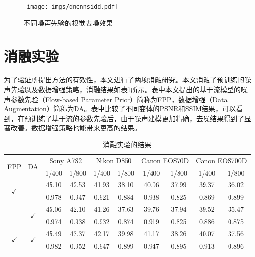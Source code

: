 \begin{figure}[h]
	\centering
	\texttt{[image: imgs/dncnnsidd.pdf]}
	\caption{不同噪声先验的视觉去噪效果}
	\label{fig:dncnnsidd}
\end{figure}

\section{消融实验}

为了验证所提出方法的有效性，本文进行了两项消融研究。本文消融了预训练的噪声先验以及数据增强策略，消融结果如表\ref{ablation}所示。表中本文提出的基于流模型的噪声参数先验（Flow-based Parameter Prior）简称为FPP，数据增强（Data Augmentation）简称为DA。表中比较了不同变体的PSNR和SSIM结果，可以看到，在预训练了基于流的参数先验后，由于噪声建模更加精确，去噪结果得到了显著改善。数据增强策略也能带来更高的结果。

\begin{table}[h]
	\begin{center}
		\caption{消融实验的结果}
		\label{ablation}
		\begin{tabular}{cc|cc|cc|cc|cc}
			\toprule[1.5pt]
			\multirow{2}{*}{FPP} & \multirow{2}{*}{DA} & \multicolumn{2}{c|}{ Sony A7S2 } & \multicolumn{2}{c|}{ Nikon D850 } & \multicolumn{2}{c|}{ Canon EOS70D } & \multicolumn{2}{c}{ Canon EOS700D } \\
			& & 1/400 & 1/800 & 1/400 & 1/800 & 1/400 & 1/800 & 1/400 & 1/800 \\
			\midrule[1pt]
			
			\multirow{2}{*}{$\checkmark$} & & 45.10 & 42.53 & 41.93 & 38.10 & 40.06 & 37.99 & 39.37 & 36.02 \\
			& & 0.978 & 0.947 & 0.921 & 0.884 & 0.938 & 0.825 & 0.869 & 0.899 \\
			\midrule[1pt] 
			
			& \multirow{2}{*}{$\checkmark$} & 45.06 & 42.10 & 41.26 & 37.63 & 39.76 & 37.94 & 39.52 & 35.47 \\
			& & 0.974 & 0.938 & 0.932 & 0.874 & 0.919 & 0.825 & 0.886 & 0.875 \\
			\midrule[1pt] 
			
			\multirow{2}{*}{$\checkmark$} & \multirow{2}{*}{$\checkmark$} & 45.49 & 43.37 & 42.17 & 39.98 & 41.17 & 38.26 & 40.07 & 37.56 \\
			& & 0.982 & 0.952 & 0.947 & 0.899 & 0.947 & 0.895 & 0.913 & 0.896 \\
			\bottomrule[1.5pt]
		\end{tabular}
	\end{center}
\end{table}